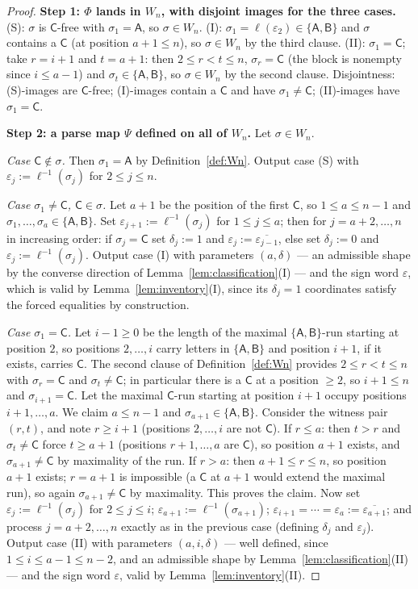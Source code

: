 \documentclass[11pt]{article}
\theoremstyle{definition}
\theoremstyle{remark}
\newcommand{\sA}{\mathsf{A}}
\newcommand{\sB}{\mathsf{B}}
\newcommand{\sC}{\mathsf{C}}
\newcommand{\Wn}{W_n}
\begin{document}
\begin{proof}
\textbf{Step 1: $\Phi$ lands in $\Wn$, with disjoint images for the three
cases.} (S): $\sigma$ is $\sC$-free with $\sigma_1=\sA$, so $\sigma\in\Wn$.
(I): $\sigma_1=\ell(\varepsilon_2)\in\{\sA,\sB\}$ and $\sigma$ contains a
$\sC$ (at position $a+1\le n$), so $\sigma\in\Wn$ by the third clause.
(II): $\sigma_1=\sC$; take $r=i+1$ and $t=a+1$: then $2\le r<t\le n$,
$\sigma_r=\sC$ (the block is nonempty since $i\le a-1$) and
$\sigma_t\in\{\sA,\sB\}$, so $\sigma\in\Wn$ by the second clause.
Disjointness: (S)-images are $\sC$-free; (I)-images contain a $\sC$ and
have $\sigma_1\neq\sC$; (II)-images have $\sigma_1=\sC$.

\textbf{Step 2: a parse map $\Psi$ defined on all of $\Wn$.} Let
$\sigma\in\Wn$.

\emph{Case $\sC\notin\sigma$.} Then $\sigma_1=\sA$ by
Definition~\ref{def:Wn}. Output case (S) with
$\varepsilon_j:=\ell^{-1}(\sigma_j)$ for $2\le j\le n$.

\emph{Case $\sigma_1\neq\sC$, $\sC\in\sigma$.} Let $a+1$ be the position of
the first $\sC$, so $1\le a\le n-1$ and
$\sigma_1,\dots,\sigma_a\in\{\sA,\sB\}$. Set
$\varepsilon_{j+1}:=\ell^{-1}(\sigma_j)$ for $1\le j\le a$; then for
$j=a+2,\dots,n$ in increasing order: if $\sigma_j=\sC$ set $\delta_j:=1$
and $\varepsilon_j:=\overline{\varepsilon_{j-1}}$, else set $\delta_j:=0$
and $\varepsilon_j:=\ell^{-1}(\sigma_j)$. Output case (I) with parameters
$(a,\delta)$ --- an admissible shape by the converse direction of
Lemma~\ref{lem:classification}(I) --- and the sign word $\varepsilon$,
which is valid by Lemma~\ref{lem:inventory}(I), since its $\delta_j=1$
coordinates satisfy the forced equalities by construction.

\emph{Case $\sigma_1=\sC$.} Let $i-1\ge0$ be the length of the maximal
$\{\sA,\sB\}$-run starting at position $2$, so positions $2,\dots,i$ carry
letters in $\{\sA,\sB\}$ and position $i+1$, if it exists, carries $\sC$.
The second clause of Definition~\ref{def:Wn} provides $2\le r<t\le n$ with
$\sigma_r=\sC$ and $\sigma_t\neq\sC$; in particular there is a $\sC$ at a
position $\ge2$, so $i+1\le n$ and $\sigma_{i+1}=\sC$. Let the maximal
$\sC$-run starting at position $i+1$ occupy positions $i+1,\dots,a$. We
claim $a\le n-1$ and $\sigma_{a+1}\in\{\sA,\sB\}$. Consider the witness
pair $(r,t)$, and note $r\ge i+1$ (positions $2,\dots,i$ are not $\sC$). If
$r\le a$: then $t>r$ and $\sigma_t\neq\sC$ force $t\ge a+1$ (positions
$r+1,\dots,a$ are $\sC$), so position $a+1$ exists, and
$\sigma_{a+1}\neq\sC$ by maximality of the run. If $r>a$: then
$a+1\le r\le n$, so position $a+1$ exists; $r=a+1$ is impossible (a $\sC$
at $a+1$ would extend the maximal run), so again $\sigma_{a+1}\neq\sC$ by
maximality. This proves the claim. Now set
$\varepsilon_j:=\ell^{-1}(\sigma_j)$ for $2\le j\le i$;
$\varepsilon_{a+1}:=\ell^{-1}(\sigma_{a+1})$;
$\varepsilon_{i+1}=\cdots=\varepsilon_a:=\overline{\varepsilon_{a+1}}$; and
process $j=a+2,\dots,n$ exactly as in the previous case (defining
$\delta_j$ and $\varepsilon_j$). Output case (II) with parameters
$(a,i,\delta)$ --- well defined, since $1\le i\le a-1\le n-2$, and an
admissible shape by Lemma~\ref{lem:classification}(II) --- and the sign
word $\varepsilon$, valid by Lemma~\ref{lem:inventory}(II).


\end{proof}
\end{document}
